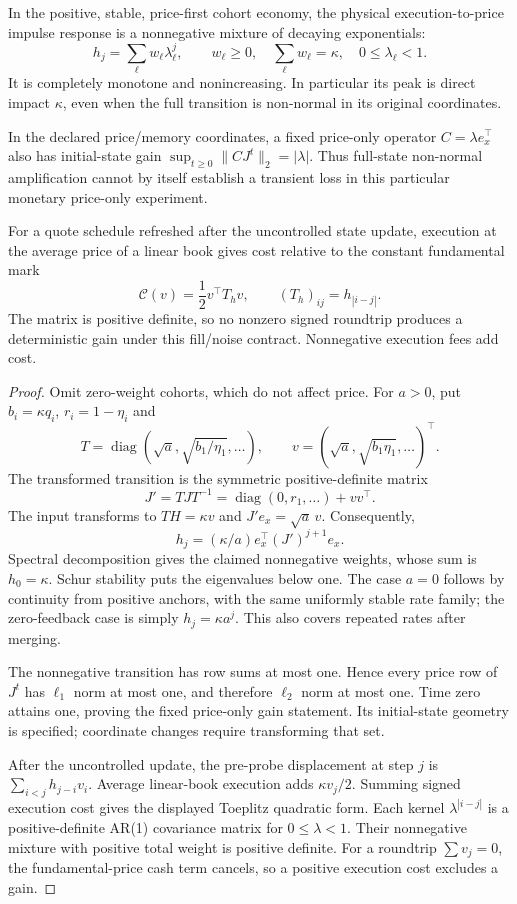 \documentclass[11pt]{article}
\begin{document}
\begin{lemma}
\label{lem:positive_price_kernel}
In the positive, stable, price-first cohort economy, the physical execution-to-price impulse response is a nonnegative mixture of decaying exponentials:
\[
h_j=\sum_\ell w_\ell\lambda_\ell^j,\qquad
w_\ell\ge0,\quad \sum_\ell w_\ell=\kappa,\quad 0\le\lambda_\ell<1.
\]
It is completely monotone and nonincreasing. In particular its peak is direct impact $\kappa$, even when the full transition is non-normal in its original coordinates.

In the declared price/memory coordinates, a fixed price-only operator $C=\lambda e_x^\top$ also has initial-state gain $\sup_{t\ge0}\|CJ^t\|_2=|\lambda|$. Thus full-state non-normal amplification cannot by itself establish a transient loss in this particular monetary price-only experiment.

For a quote schedule refreshed after the uncontrolled state update, execution at the average price of a linear book gives cost relative to the constant fundamental mark
\[
\mathcal C(v)=\frac12v^\top T_hv,\qquad
(T_h)_{ij}=h_{|i-j|}.
\]
The matrix is positive definite, so no nonzero signed roundtrip produces a deterministic gain under this fill/noise contract. Nonnegative execution fees add cost.
\end{lemma}
\begin{proof}
Omit zero-weight cohorts, which do not affect price. For $a>0$, put $b_i=\kappa q_i$, $r_i=1-\eta_i$ and
\[
T=\operatorname{diag}(\sqrt a,\sqrt{b_1/\eta_1},\ldots),\qquad
v=(\sqrt a,\sqrt{b_1\eta_1},\ldots)^\top.
\]
The transformed transition is the symmetric positive-definite matrix
\[
J'=TJT^{-1}=\operatorname{diag}(0,r_1,\ldots)+vv^\top.
\]
The input transforms to $TH=\kappa v$ and $J'e_x=\sqrt a\,v$. Consequently,
\[
h_j=(\kappa/a)e_x^\top(J')^{j+1}e_x.
\]
Spectral decomposition gives the claimed nonnegative weights, whose sum is $h_0=\kappa$. Schur stability puts the eigenvalues below one. The case $a=0$ follows by continuity from positive anchors, with the same uniformly stable rate family; the zero-feedback case is simply $h_j=\kappa a^j$. This also covers repeated rates after merging.

The nonnegative transition has row sums at most one. Hence every price row of $J^t$ has $\ell_1$ norm at most one, and therefore $\ell_2$ norm at most one. Time zero attains one, proving the fixed price-only gain statement. Its initial-state geometry is specified; coordinate changes require transforming that set.

After the uncontrolled update, the pre-probe displacement at step $j$ is $\sum_{i<j}h_{j-i}v_i$. Average linear-book execution adds $\kappa v_j/2$. Summing signed execution cost gives the displayed Toeplitz quadratic form. Each kernel $\lambda^{|i-j|}$ is a positive-definite AR(1) covariance matrix for $0\le\lambda<1$. Their nonnegative mixture with positive total weight is positive definite. For a roundtrip $\sum v_j=0$, the fundamental-price cash term cancels, so a positive execution cost excludes a gain.
\end{proof}
\end{document}
